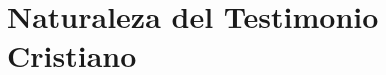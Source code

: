 \documentclass[../main.tex]{subfiles}
\begin{document}
\chapter{Naturaleza del Testimonio Cristiano}






\end{document}

